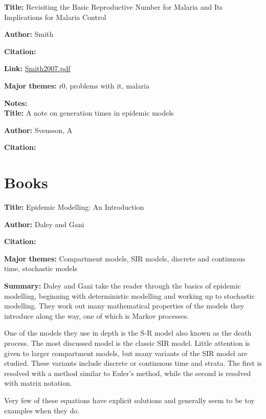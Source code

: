 \message{ !name(refs.tex)}\documentclass{article}
\begin{document}

\textbf{Title:}  Revisiting the Basic Reproductive Number for Malaria and Its Implications for Malaria Control

\textbf{Author:}  Smith

\textbf{Citation:}\cite{Smith2007}

\textbf{Link:} \url{Smith2007.pdf}

\textbf{Major themes:}  r0, problems with it, malaria

\textbf{Notes:}
\\

\textbf{Title:}  A note on generation times in epidemic models 

\textbf{Author:}  Svensson, A

\textbf{Citation:}\cite{Svensson2007}





\section{Books}

\textbf{Title:} Epidemic Modelling:  An Introduction

\textbf{Author:}  Daley and Gani

\textbf{Citation:} \cite{daley2001epidemic}

\textbf{Major themes:} Compartment models, SIR models, discrete and continuous time, stochastic models

\textbf{Summary:}  Daley and Gani take the reader through the basics of epidemic modelling, beginning with deterministic modelling and working up to stochastic modelling.  They work out many mathematical properties of the models they introduce along the way, one of which is Markov processes.

One of the models they use in depth is the S-R model also known as the death process.  The most discussed model is the classic SIR model.  Little attention is given to larger compartment models, but many variants of the SIR model are studied.  These variants include discrete or continuous time and strata.  The first is resolved with a method similar to Euler's method, while the second is resolved with matrix notation.

Very few of these equations have explicit solutions and generally seem to be toy examples when they do.
\end{document}
